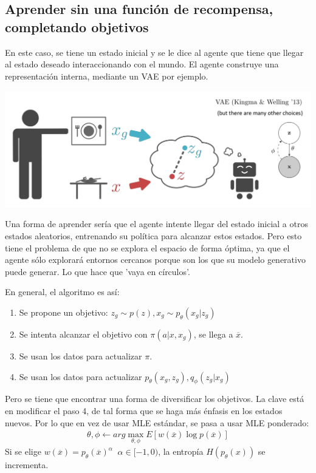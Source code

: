 \subsection{Aprender sin una función de recompensa, completando objetivos}%
\label{sub:aprender_sin_una_función_de_recompensa_completando_objetivos}

En este caso, se tiene un estado inicial y se le dice al agente que tiene que llegar al estado
deseado interaccionando con el mundo. El agente construye una representación interna, mediante
un VAE por ejemplo.

\begin{center}
\includegraphics[width=.8\textwidth]{figures/2020-08-07-135150_1179x448_scrot.png}
\end{center}

Una forma de aprender sería que el agente intente llegar del estado inicial a otros estados
aleatorios, entrenando su política para alcanzar estos estados. Pero esto tiene el problema de
que no se explora el espacio de forma óptima, ya que el agente sólo explorará entornos
cercanos porque son los que su modelo generativo puede generar. Lo que hace que 'vaya en
círculos'.

En general, el algoritmo es así:
\begin{enumerate}
    \item Se propone un objetivo: $z_g\sim p(z), x_g\sim p_\theta (x_g|z_g)$
    \item Se intenta alcanzar el objetivo con $\pi(a|x,x_g)$, se llega a  $\overline{x}$.
    \item Se usan los datos para actualizar $\pi$.
    \item Se usan los datos para actualizar $p_\theta(x_g,z_g), q_\phi(z_g|x_g)$
\end{enumerate}

Pero se tiene que encontrar una forma de diversificar los objetivos. La clave está en
modificar el paso 4, de tal forma que se haga más énfasis en los estados nuevos. Por lo que
en vez de usar MLE estándar, se pasa a usar MLE ponderado:
\begin{align}
    \theta,\phi \gets arg\max_{\theta,\phi} E[w(\overline{x})\log p(\overline{x})]
\end{align}
Si se elige $w(\overline{x})=p_\theta(\overline{x})^\alpha\;\;\alpha\in [-1,0)$, la entropía
$H(p_\theta(x))$ se incrementa.

